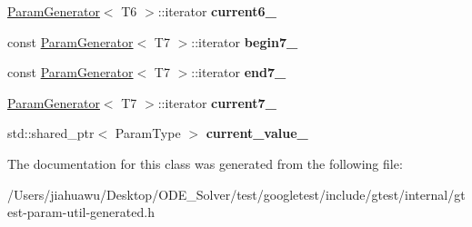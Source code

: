 \begin{DoxyCompactItemize}
\mbox{\hyperlink{classtesting_1_1internal_1_1_param_generator}{Param\+Generator}}$<$ T6 $>$\+::iterator {\bfseries current6\+\_\+}
\item 
\mbox{\label{classtesting_1_1internal_1_1_cartesian_product_generator7_1_1_iterator_ab8452741b3eaea0ca77da1c41abf23c7}} 
const \mbox{\hyperlink{classtesting_1_1internal_1_1_param_generator}{Param\+Generator}}$<$ T7 $>$\+::iterator {\bfseries begin7\+\_\+}
\item 
\mbox{\label{classtesting_1_1internal_1_1_cartesian_product_generator7_1_1_iterator_a492da2896bf2527e4c0347db3f8cca91}} 
const \mbox{\hyperlink{classtesting_1_1internal_1_1_param_generator}{Param\+Generator}}$<$ T7 $>$\+::iterator {\bfseries end7\+\_\+}
\item 
\mbox{\label{classtesting_1_1internal_1_1_cartesian_product_generator7_1_1_iterator_a44ee2e3882390471e5d064e9280d3b47}} 
\mbox{\hyperlink{classtesting_1_1internal_1_1_param_generator}{Param\+Generator}}$<$ T7 $>$\+::iterator {\bfseries current7\+\_\+}
\item 
\mbox{\label{classtesting_1_1internal_1_1_cartesian_product_generator7_1_1_iterator_a3df4defc9419774757e1cef7e93bc870}} 
std\+::shared\+\_\+ptr$<$ Param\+Type $>$ {\bfseries current\+\_\+value\+\_\+}
\end{DoxyCompactItemize}


The documentation for this class was generated from the following file\+:\begin{DoxyCompactItemize}
\item 
/\+Users/jiahuawu/\+Desktop/\+O\+D\+E\+\_\+\+Solver/test/googletest/include/gtest/internal/gtest-\/param-\/util-\/generated.\+h\end{DoxyCompactItemize}
